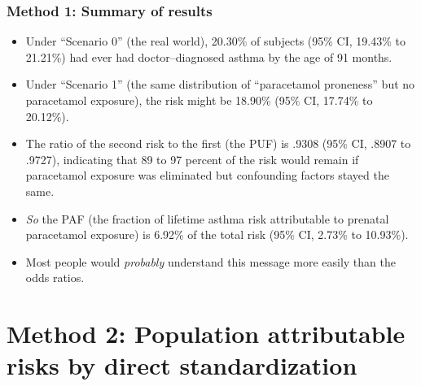 \documentclass[11pt]{beamer}
\begin{document}
\begin{frame}
\frametitle{Method 1: Summary of results}

\begin{itemize}

\item<2-> Under ``Scenario 0'' (the real world),
20.30\% of subjects (95\% CI, 19.43\% to 21.21\%)
had ever had doctor--diagnosed asthma by the age of 91 months.

\item<3-> Under ``Scenario 1'' (the same distribution of ``paracetamol proneness''
but no paracetamol exposure),
the risk might be 18.90\%
(95\% CI, 17.74\% to 20.12\%).

\item<4-> The ratio of the second risk to the first (the PUF)
is .9308 (95\% CI, .8907 to .9727),
indicating that 89 to 97 percent of the risk would remain
if paracetamol exposure was eliminated but confounding factors stayed the same.

\item<5-> \textit{So} the PAF
(the fraction of lifetime asthma risk attributable to prenatal paracetamol exposure)
is 6.92\% of the total risk (95\% CI, 2.73\% to 10.93\%).

\item<6-> Most people would \textit{probably} understand this message more easily than the odds ratios.

\end{itemize}

\end{frame}

\section{Method 2: Population attributable risks by direct standardization}
\end{document}
